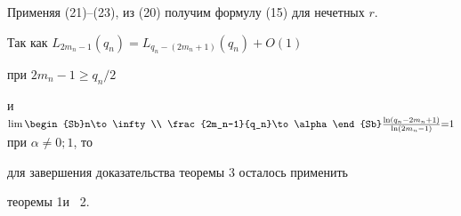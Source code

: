 \begin{pf}
Применяя (21)--(23), из (20) получим формулу (15) для нечетных $r$. 


 


Так как $L_{2m_n-1}(q_n)=L_{q_n-(2m_n+1)}(q_n)+O(1)$ 


при $2m_n-1\ge q_n/2$ 


и $\lim\limits\begin{Sb}n\to\infty \\ \frac{2m_n-1}{q_n}\to\alpha 


\end{Sb}\frac{\ln(q_n-2m_n+1)}{\ln(2m_n-1)}{=}1$ при $\alpha\ne0;1$, то 


для завершения доказательства теоремы 3 осталось применить


теоремы 1\linebreak и ~2. 


\end{pf} 


 


 


 


